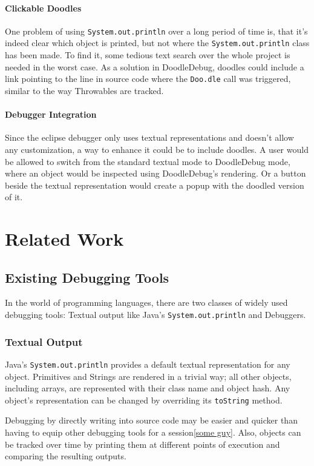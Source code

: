 \documentclass[english]{scrartcl}
\newcommand{\DD}{Dood\-le\-De\-bug\xspace}
\newcommand{\Doodle}{\texttt{Doo.\-dle}\xspace}
\newcommand{\println}{\texttt{Sys\-tem.\-out.\-println}\xspace}
\begin{document}
\paragraph{Clickable Doodles}
One problem of using \println over a long period of time is, that it's indeed clear which object is printed, but not where the \println class has been made.
To find it, some tedious text search over the whole project is needed in the worst case.
As a solution in \DD, doodles could include a link pointing to the line in source code where the \Doodle call was triggered, similar to the way Throwables are tracked.

\paragraph{Debugger Integration}
Since the eclipse debugger only uses textual representations and doesn't allow any customization, a way to enhance it could be to include doodles.
A user would be allowed to switch from the standard textual mode to \DD mode, where an object would be inspected using \DD's rendering.
Or a button beside the textual representation would create a popup with the doodled version of it.

\section{Related Work}
\subsection{Existing Debugging Tools}
In the world of programming languages, there are two classes of widely used debugging tools:
Textual output like Java's \println and Debuggers.

\subsubsection{Textual Output}
Java's \println provides a default textual representation for any object.
Primitives and Strings are rendered in a trivial way; all other objects, including arrays, are represented with their class name and object hash.
Any object's representation can be changed by overriding its \texttt{toString} method.

Debugging by directly writing into source code may be easier and quicker than having to equip other debugging tools for a session\ref{some guy}.
Also, objects can be tracked over time by printing them at different points of execution and comparing the resulting outputs.
\end{document}
